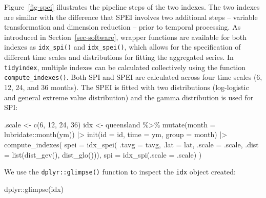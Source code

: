 \documentclass[
]{interact}
\newenvironment{Shaded}{\begin{snugshade}}{\end{snugshade}}
\newcommand{\AttributeTok}[1]{\textcolor[rgb]{0.40,0.45,0.13}{#1}}
\newcommand{\DecValTok}[1]{\textcolor[rgb]{0.68,0.00,0.00}{#1}}
\newcommand{\FunctionTok}[1]{\textcolor[rgb]{0.28,0.35,0.67}{#1}}
\newcommand{\NormalTok}[1]{\textcolor[rgb]{0.00,0.23,0.31}{#1}}
\newcommand{\OtherTok}[1]{\textcolor[rgb]{0.00,0.23,0.31}{#1}}
\newcommand{\SpecialCharTok}[1]{\textcolor[rgb]{0.37,0.37,0.37}{#1}}
\begin{document}
Figure~\ref{fig-spei} illustrates the pipeline steps of the two indexes.
The two indexes are similar with the difference that SPEI involves two
additional steps -- variable transformation and dimension reduction --
prior to temporal processing. As introduced in
Section~\ref{sec-software}, wrapper functions are available for both
indexes as \texttt{idx\_spi()} and \texttt{idx\_spei()}, which allows
for the specification of different time scales and distributions for
fitting the aggregated series. In \texttt{tidyindex}, multiple indexes
can be calculated collectively using the function
\texttt{compute\_indexes()}. Both SPI and SPEI are calculated across
four time scales (6, 12, 24, and 36 months). The SPEI is fitted with two
distributions (log-logistic and general extreme value distribution) and
the gamma distribution is used for SPI:

\begin{Shaded}
\begin{Highlighting}[]
\NormalTok{.scale }\OtherTok{\textless{}{-}} \FunctionTok{c}\NormalTok{(}\DecValTok{6}\NormalTok{, }\DecValTok{12}\NormalTok{, }\DecValTok{24}\NormalTok{, }\DecValTok{36}\NormalTok{)}
\NormalTok{idx }\OtherTok{\textless{}{-}}\NormalTok{ queensland }\SpecialCharTok{\%\textgreater{}\%}
  \FunctionTok{mutate}\NormalTok{(}\AttributeTok{month =}\NormalTok{ lubridate}\SpecialCharTok{::}\FunctionTok{month}\NormalTok{(ym)) }\SpecialCharTok{|\textgreater{}}
  \FunctionTok{init}\NormalTok{(}\AttributeTok{id =}\NormalTok{ id, }\AttributeTok{time =}\NormalTok{ ym, }\AttributeTok{group =}\NormalTok{ month) }\SpecialCharTok{|\textgreater{}} 
  \FunctionTok{compute\_indexes}\NormalTok{(}
    \AttributeTok{spei =} \FunctionTok{idx\_spei}\NormalTok{(}
      \AttributeTok{.tavg =}\NormalTok{ tavg, }\AttributeTok{.lat =}\NormalTok{ lat, }
      \AttributeTok{.scale =}\NormalTok{ .scale, }\AttributeTok{.dist =} \FunctionTok{list}\NormalTok{(}\FunctionTok{dist\_gev}\NormalTok{(), }\FunctionTok{dist\_glo}\NormalTok{())),}
    \AttributeTok{spi =} \FunctionTok{idx\_spi}\NormalTok{(}\AttributeTok{.scale =}\NormalTok{ .scale)}
\NormalTok{  )}
\end{Highlighting}
\end{Shaded}

We use the \texttt{dplyr::glimpse()} function to inspect the
\texttt{idx} object created:

\begin{Shaded}
\begin{Highlighting}[]
\NormalTok{dplyr}\SpecialCharTok{::}\FunctionTok{glimpse}\NormalTok{(idx)}
\end{Highlighting}
\end{Shaded}
\end{document}
